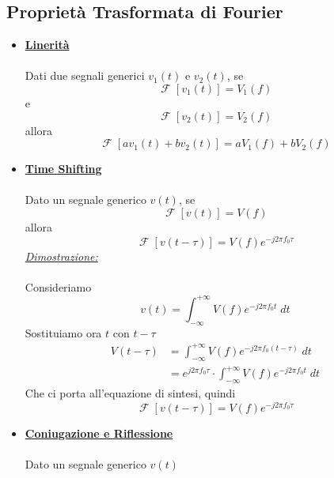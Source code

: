 \documentclass{article}
\newcommand{\Fourier}{\mathop{\mathcal{F}}}
\begin{document}
	    \subsection{Proprietà Trasformata di Fourier}
	        \begin{itemize}
	            \item \underline{\textbf{Linerità}} \\
	                  \\
	                  Dati due segnali generici $ v_1(t) $ e $ v_2(t) $, se
	                  \[
	                    \Fourier[v_1(t)] = V_1(f)
	                  \]
	                  e
	                  \[
	                    \Fourier[v_2(t)] = V_2(f)
	                  \]
	                  allora
	                  \[
	                    \Fourier[av_1(t) + bv_2(t)] = aV_1(f) + bV_2(f)
	                  \]
	            \item \underline{\textbf{Time Shifting}} \\
	                  \\
	                  Dato un segnale generico $ v(t) $, se
	                  \[
	                    \Fourier[v(t)] = V(f)
	                  \]
	                  allora
	                  \[
	                    \Fourier[v(t - \tau)] = V(f) e^{-j2\pi f_0 \tau}
	                  \]
	                  \underline{\textit{Dimostrazione:}} \\
	                  \\
	                  Consideriamo
	                  \[
	                    v(t) = \int_{-\infty}^{+\infty} {V(f) e^{-j2\pi f_0 t}\; dt}
	                  \]
	                  Sostituiamo ora $ t $ con $ t - \tau $
	                  \[
	                    \begin{aligned}
	                        V(t - \tau) &= \int_{-\infty}^{+\infty} {V(f) e^{-j2\pi f_0 (t - \tau)}\; dt} \\
	                        &= e^{j2\pi f_0 \tau} \cdot \int_{-\infty}^{+\infty} {V(f) e^{-j2\pi f_0 t}\; dt}
	                    \end{aligned}
	                  \]
	                  Che ci porta all'equazione di sintesi, quindi
	                  \[
	                    \Fourier[v(t - \tau)] = V(f) e^{-j2\pi f_0 \tau}
	                  \]
				\item \underline{\textbf{Coniugazione e Riflessione}} \\
					  \\
					  Dato un segnale generico $ v(t) $

\end{itemize}
\end{document}
